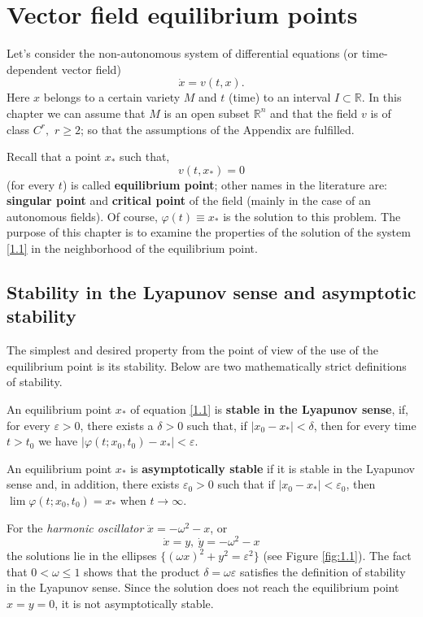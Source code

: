 \chapter{Vector field equilibrium points}

Let's consider the non-autonomous system of differential equations (or time-dependent vector field)
\begin{equation}\label{1.1}
	\dot{x} = v (t, x).
\end{equation}
Here $x$ belongs to a certain variety $M$ and $t$ (time) to an interval $I\subset \mathbb{R}$. In this chapter we can assume that $M$ is an open subset $\mathbb{R}^n$ and that the field $v$ is of class $C^r,$ $r\geq 2$; so that the assumptions of the Appendix are fulfilled.

Recall that a point $x_*$ such that,
$$
v(t,x_{\ast })=0
$$
(for every $t$) is called \textbf{equilibrium point}; other names in the literature are:
\textbf{singular point} and \textbf{critical point} of the field (mainly in the case of an autonomous fields).
Of course, $\varphi(t) \equiv x_*$ is the solution to this problem. The purpose of this chapter is to examine the
properties of the solution of the system \eqref{1.1} in the neighborhood of the equilibrium point.

\section{Stability in the Lyapunov sense and asymptotic stability}
The simplest and desired property from the point of view of the use of the equilibrium point is its stability. Below are two mathematically strict definitions of stability.
\begin{definition}\label{def:1.1}
	An equilibrium point $x_*$ of equation \eqref{1.1} is \textbf{stable in the Lyapunov sense}, if, for every $\varepsilon > 0$, there exists a $\delta > 0$ such that, if $\left|x_0-x_* \right| < \delta$, then for every time $t> t_0$ we have $\left|\varphi(t;x_0,t_0) - x_* \right| < \varepsilon$.
		
	An equilibrium point $x_*$ is \textbf{asymptotically stable} if it is stable in the Lyapunov sense and, in addition, there exists $\varepsilon_0 > 0$ such that if $\left|x_0-x_* \right| < \varepsilon_0$, then $\lim \varphi(t;x_0,t_0) = x_*$ when $t \to \infty$.
\end{definition}

\begin{example}
	For the \textit{harmonic oscillator} $\ddot{x} = - \omega^2-x$, or
	$$\dot{x} = y,\ \dot{y} =  - \omega^2-x$$
	the solutions lie in the ellipses $\{ (\omega x)^2 + y^2 = \varepsilon^2 \}$ (see Figure \ref{fig:1.1}). The fact that $0 < \omega \leq 1$ shows that the product $\delta = \omega \varepsilon$ satisfies the definition of stability in the Lyapunov sense. Since the solution does not reach the equilibrium point $x = y = 0$, it is not asymptotically stable.
\end{example}

